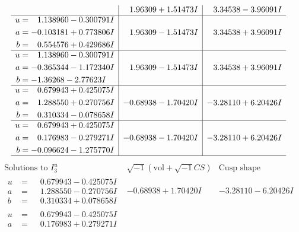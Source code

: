 \documentclass[1p]{elsarticle_modified}
\theoremstyle{definition}
\newcommand{\I}{\sqrt{-1}}
\begin{document}
$$\begin{array}{c|c|c}
 & \phantom{-}1.96309 + 1.51473 I & \phantom{-}3.34538 - 3.96091 I \\ \hline\begin{aligned}
u &= \phantom{-}1.138960 - 0.300791 I \\
a &= -0.103181 + 0.773806 I \\
b &= \phantom{-}0.554576 + 0.429686 I\end{aligned}
 & \phantom{-}1.96309 - 1.51473 I & \phantom{-}3.34538 + 3.96091 I \\ \hline\begin{aligned}
u &= \phantom{-}1.138960 - 0.300791 I \\
a &= -0.365344 - 1.172340 I \\
b &= -1.36268 - 2.77623 I\end{aligned}
 & \phantom{-}1.96309 - 1.51473 I & \phantom{-}3.34538 + 3.96091 I \\ \hline\begin{aligned}
u &= \phantom{-}0.679943 + 0.425075 I \\
a &= \phantom{-}1.288550 + 0.270756 I \\
b &= \phantom{-}0.310334 - 0.078658 I\end{aligned}
 & -0.68938 - 1.70420 I & -3.28110 + 6.20426 I \\ \hline\begin{aligned}
u &= \phantom{-}0.679943 + 0.425075 I \\
a &= \phantom{-}0.176983 - 0.279271 I \\
b &= -0.096624 - 1.275770 I\end{aligned}
 & -0.68938 - 1.70420 I & -3.28110 + 6.20426 I\\
 \hline 
 \end{array}$$\newpage$$\begin{array}{c|c|c}  
\text{Solutions to }I^u_{3}& \I (\text{vol} + \sqrt{-1}CS) & \text{Cusp shape}\\
 \hline 
\begin{aligned}
u &= \phantom{-}0.679943 - 0.425075 I \\
a &= \phantom{-}1.288550 - 0.270756 I \\
b &= \phantom{-}0.310334 + 0.078658 I\end{aligned}
 & -0.68938 + 1.70420 I & -3.28110 - 6.20426 I \\ \hline\begin{aligned}
u &= \phantom{-}0.679943 - 0.425075 I \\
a &= \phantom{-}0.176983 + 0.279271 I \\

\end{aligned}
\end{array}$$
\end{document}
